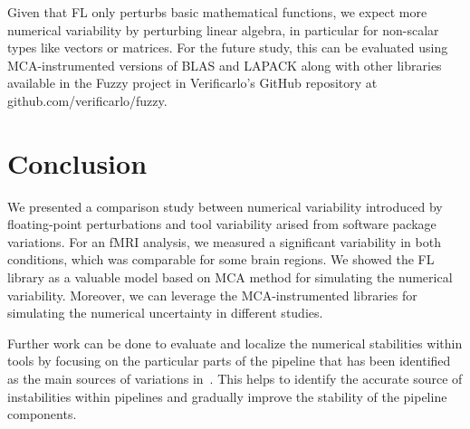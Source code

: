   Given that FL only perturbs basic mathematical functions, we expect more numerical variability by perturbing linear algebra,
  in particular for non-scalar types like vectors or matrices. For the future study, this can be evaluated using MCA-instrumented versions
  of BLAS and LAPACK along with other libraries available in the Fuzzy project in Verificarlo's GitHub repository at github.com/verificarlo/fuzzy.
    
  
  \section{Conclusion}
  
  We presented a comparison study between numerical variability introduced by floating-point perturbations and tool variability arised from software package variations.
  For an fMRI analysis, we measured a significant variability in both conditions, which was comparable for some brain regions.
  We showed the FL library as a valuable model based on MCA method for simulating the numerical variability.
  Moreover, we can leverage the MCA-instrumented libraries for simulating the numerical uncertainty in different studies.
  
  Further work can be done to evaluate and localize the numerical stabilities within tools by focusing on the particular parts of
  the pipeline that has been identified as the main sources of variations in~\cite{bowring2021isolating}.
  This helps to identify the accurate source of instabilities within pipelines and gradually improve the stability of the pipeline components.
    
  